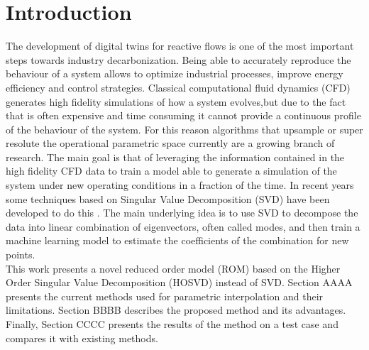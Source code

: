 \section{Introduction}
The development of digital twins for reactive flows is one of the most important steps towards industry decarbonization. Being able to accurately reproduce the behaviour of a system allows to optimize industrial processes, improve energy efficiency and control strategies. Classical computational fluid dynamics (CFD) generates high fidelity simulations of how a system evolves,but due to the fact that is often expensive and time consuming it cannot provide a continuous profile of the behaviour of the system. 
For this reason algorithms that upsample or super resolute the operational parametric space currently are a growing branch of research. The main goal is that of leveraging the information contained in the high fidelity CFD data to train a model able to generate a simulation of the system under new operating conditions in a fraction of the time. 
In recent years some techniques based on Singular Value Decomposition (SVD) have been developed to do this \cite{aversano2021digital} \cite{aversano2021digital}. The main underlying idea is to use SVD to decompose the data into linear combination of eigenvectors, often called modes, and then train a machine learning model to estimate the coefficients of the combination for new points.  
\\

This work presents a novel reduced order model (ROM) based on the Higher Order Singular Value Decomposition (HOSVD) instead of SVD.
 Section AAAA presents the current methods used for parametric interpolation and their limitations. Section BBBB describes the proposed method and its advantages. Finally, Section CCCC presents the results of the method on a test case and compares it with existing methods.
